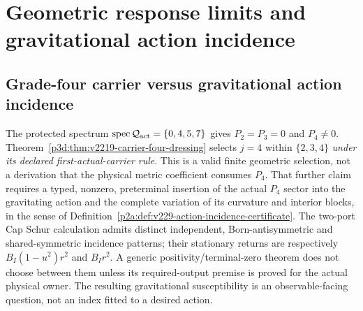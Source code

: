 \documentclass[12pt,a4paper]{article}
\begin{document}
\section{Geometric response limits and gravitational action incidence}
\label{paper3d:sec:response-incidence}
\subsection{Grade-four carrier versus gravitational action incidence}
\label{p3d:sec:v229-actual-carrier-port}
\begin{remark}
\label{p3d:rem:v229-actual-gravitational-incidence}
The protected spectrum $\operatorname{spec}\mathcal Q_{\rm act}
=\{0,4,5,7\}$ gives $P_2=P_3=0$ and $P_4\ne0$.
Theorem~\ref{p3d:thm:v2219-carrier-four-dressing} selects $j=4$
within $\{2,3,4\}$ \emph{under its declared first-actual-carrier
rule}.  This is a valid finite geometric selection, not a derivation
that the physical metric coefficient consumes $P_4$.  That further
claim requires a typed, nonzero, preterminal insertion of the actual
$P_4$ sector into the gravitating action and the complete variation
of its curvature and interior blocks, in the sense of
Definition~\ref{p2a:def:v229-action-incidence-certificate}.
The two-port Cap Schur calculation admits distinct independent,
Born-antisymmetric and shared-symmetric incidence patterns; their
stationary returns are respectively $B_I(1-u^2)r^2$ and $B_Ir^2$.
A generic positivity/terminal-zero theorem does not choose between
them unless its required-output premise is proved for the actual
physical owner.  The resulting gravitational susceptibility is an
observable-facing question, not an index fitted to a desired action.
\end{remark}
\end{document}

